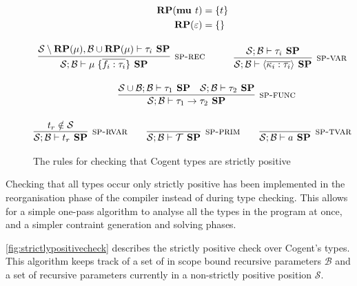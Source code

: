 \begin{figure}
    \centering
    \begin{gather*}
    \begin{split}
        \textbf{RP}(\textbf{mu } t) &= \{t\} \\
        \textbf{RP}(\varepsilon) &= \{\}
    \end{split} \\[10pt]
    \infer[\textsc{sp-rec}]{
        \mathcal{S}; \mathcal{B} \vdash \mu\; \{\overline { f_i : \tau_i } \} \textbf{ SP}
    }{
        \mathcal{S}\setminus \textbf{RP}(\mu), \mathcal{B} \cup \textbf{RP}(\mu) \vdash \tau_i \textbf{ SP}
    }
    \hspace{3em}
    \infer[\textsc{sp-var}]{
        \mathcal{S}; \mathcal{B} \vdash \langle\overline{\kappa_i : \tau_i}\rangle \textbf{ SP}
    }{
        \mathcal{S}; \mathcal{B} \vdash \tau_i \textbf{ SP}
    } \\[10pt]
    \hspace{3em}
    \infer[\textsc{sp-func}]{
        \mathcal{S}; \mathcal{B} \vdash \tau_1 \rightarrow \tau_2 \textbf{ SP}
    }{
        \mathcal{S} \cup \mathcal{B}; \mathcal{B} \vdash \tau_1 \textbf{ SP}
        &
        \mathcal{S}; \mathcal{B} \vdash \tau_2 \textbf{ SP}
    } \\[10pt]
    \infer[\textsc{sp-rvar}]{
        \mathcal{S}; \mathcal{B} \vdash t_r \textbf{ SP}
    }{
        t_r \notin \mathcal{S}
    }
    \hspace{2em}
    \infer[\textsc{sp-prim}]{
        \mathcal{S}; \mathcal{B} \vdash \mathcal{T} \textbf{ SP}
    }{}
    \hspace{2em}
    \infer[\textsc{sp-tvar}]{
        \mathcal{S}; \mathcal{B} \vdash a \textbf{ SP}
    }{}
    \end{gather*}
    \caption{The rules for checking that Cogent types are strictly positive}
    \label{fig:strictlypositivecheck}
\end{figure}

Checking that all types occur only strictly positive has been implemented in the reorganisation phase of the compiler
instead of during type checking. This allows for a simple one-pass algorithm to analyse all the types in the program
at once, and a simpler contraint generation and solving phases.

\autoref{fig:strictlypositivecheck} describes the strictly positive check over Cogent's types.
This algorithm keeps track of a set of in scope bound recursive parameters $\mathcal{B}$ and a set of recursive
parameters currently in a non-strictly positive position $\mathcal{S}$.

